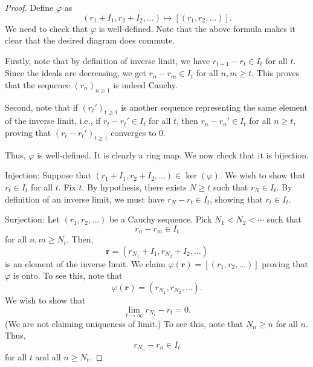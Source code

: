 \documentclass[12pt]{article}
\begin{document}
\begin{proof} 
	Define $\varphi$ as
	\begin{equation*} 
		(r_{1} + I_{1}, r_{2} + I_{2}, \ldots) \mapsto [(r_{1}, r_{2}, \ldots)].
	\end{equation*}
	We need to check that $\varphi$ is well-defined. Note that the above formula makes it clear that the desired diagram does commute.

	Firstly, note that by definition of inverse limit, we have $r_{t + 1} - r_{t} \in I_{t}$ for all $t$. Since the ideals are decreasing, we get $r_{n} - r_{m} \in I_{t}$ for all $n, m \ge t$. This proves that the sequence $(r_{n})_{n \ge 1}$ is indeed Cauchy.

	Second, note that if $(r_{t}')_{t \ge 1}$ is another sequence representing the same element of the inverse limit, i.e., if $r_{t} - r_{t}' \in I_{t}$ for all $t$, then $r_{n} - r_{n}' \in I_{t}$ for all $n \ge t$, proving that $(r_{t} - r_{t}')_{t \ge 1}$ converges to $0$.

	Thus, $\varphi$ is well-defined. It is clearly a ring map. We now check that it is bijection.

	Injection: Suppose that $(r_{1} + I_{1}, r_{2} + I_{2}, \ldots) \in \ker(\varphi)$. We wish to show that $r_{t} \in I_{t}$ for all $t$. \newline
	Fix $t$. By hypothesis, there exists $N \ge t$ such that $r_{N} \in I_{t}$. By definition of an inverse limit, we must have $r_{N} - r_{t} \in I_{t}$, showing that $r_{t} \in I_{t}$.

	Surjection: Let $(r_{1}, r_{2}, \ldots)$ be a Cauchy sequence. \newline
	Pick $N_{1} < N_{2} < \cdots$ such that 
	\begin{equation*} 
		r_{n} - r_{m} \in I_{t}
	\end{equation*}
	for all $n, m \ge N_{t}$. \newline
	Then, 
	\begin{equation*} 
		\mathbf{r} = (r_{N_{1}} + I_{1}, r_{N_{2}} + I_{2}, \ldots)
	\end{equation*}
	is an element of the inverse limit. \newline
	We claim $\varphi(\mathbf{r}) = [(r_{1}, r_{2}, \ldots)]$ proving that $\varphi$ is onto. \newline
	To see this, note that
	\begin{equation*} 
		\varphi(\mathbf{r}) = (r_{N_{1}}, r_{N_{2}}, \ldots).
	\end{equation*}
	We wish to show that
	\begin{equation*} 
		\lim_{t \to \infty} r_{N_{t}} - r_{t} = 0.
	\end{equation*}
	(We are not claiming uniqueness of limit.) \newline
	To see this, note that $N_{n} \ge n$ for all $n$. Thus,
	\begin{equation*} 
		r_{N_{n}} - r_{n} \in I_{t}
	\end{equation*}
	for all $t$ and all $n \ge N_{t}$.
\end{proof}
\end{document}
